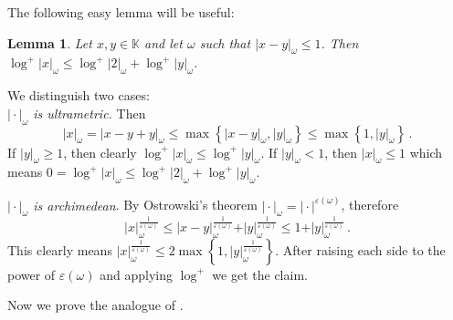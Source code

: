 \documentclass[10 pt,a4paper]{article}
\theoremstyle{plain}
\newtheorem{lem}[thm]{Lemma}
\theoremstyle{definition}
\theoremstyle{named}
\begin{document}
 The following easy lemma will be useful:
\begin{lem}\label{log2}
Let $x,y\in \mathbb K$ and let $\omega$ such that $\vert x-y\vert_\omega\le 1$. Then   $\log^+\vert x\vert_\omega\le \log^+\vert 2\vert_\omega+\log^+\vert y\vert_{\omega}$.
\end{lem}
\proof
 We distinguish two cases:\\
\emph{$\vert\cdot\vert_\omega$ is  ultrametric.} Then  
$$
\vert x\vert_\omega=\vert x-y+y\vert_\omega\le \max\left\{ \vert x-y\vert_{\omega}, \vert y\vert_{\omega}\right\}\le \max\left\{1, \vert y\vert_{\omega}\right\}\,.
$$
If $\vert y\vert_{\omega}\ge 1$, then clearly $\log^+\vert x\vert_\omega\le     \log^+\vert y\vert_\omega$. If $\vert y\vert_{\omega}<1$, then $\vert x\vert_{\omega}\le 1$ which means  $0=\log^+\vert x\vert_{\omega}\le \log^+\vert 2\vert_\omega+\log^+\vert y\vert_{\omega}$.


\emph{$\vert\cdot\vert_\omega$ is  archimedean}. By  Ostrowski's theorem $\vert\cdot\vert_\omega=\vert\cdot\vert^{\varepsilon(\omega)}$, therefore
$$
\vert x\vert^{\frac{1}{\varepsilon(\omega)}}_\omega\le\vert x-y\vert^{\frac{1}{\varepsilon(\omega)}}_{\omega}+\vert y\vert^{\frac{1}{\varepsilon(\omega)}}_\omega\le 1+\vert y\vert^{\frac{1}{\varepsilon(\omega)}}_\omega\,.
$$
This clearly means $\vert x\vert^{\frac{1}{\varepsilon(\omega)}}_\omega\le 2\max\left\{1, \vert y\vert^{\frac{1}{\varepsilon(\omega)}}_\omega\right\}$. After raising each side to the power of $\varepsilon(\omega)$ and applying $\log^+$ we get the claim.
\endproof




Now we prove the analogue of \cite[Proposition 3.1]{C}.  
\end{document}
